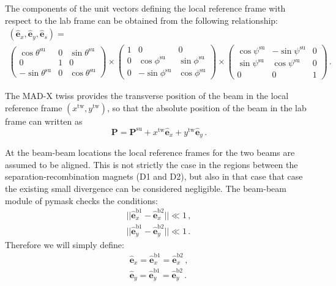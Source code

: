 The components of the unit vectors defining the local reference frame with respect to the lab frame can be obtained from the following relationship:
\begin{multline}
\left(\hat{\textbf{e}}_x, \hat{\textbf{e}}_y, \hat{\textbf{e}}_s\right)=\\
\left(\begin{array}{ccc}
\cos \theta^\text{su} & 0 & \sin \theta^\text{su} \\
0 & 1 & 0 \\
-\sin \theta^\text{su} & 0 & \cos \theta^\text{su}
\end{array}\right)
\times
\left(\begin{array}{ccc}
1 & 0 & 0 \\
0 & \cos \phi^\text{su} & \sin \phi^\text{su} \\
0 & -\sin \phi^\text{su} & \cos \phi^\text{su}
\end{array}\right)
\times
\left(\begin{array}{ccc}
\cos \psi^\text{su} & -\sin \psi^\text{su} & 0 \\
\sin \psi^\text{su} & \cos \psi^\text{su} & 0 \\
0 & 0 & 1
\end{array}\right)   \, .
\end{multline}

The MAD-X twiss provides the transverse position of the beam in the local reference frame $(x^\text{tw}, y^\text{tw})$, so that the absolute position of the beam in the lab frame can written as
\begin{equation}
    \textbf{P} = \textbf{P}^\text{su} 
    + x^\text{tw} \hat{\textbf{e}}_x
    + y^\text{tw} \hat{\textbf{e}}_y
    \, .
\end{equation}

At the beam-beam locations the local reference frames for the two beams are assumed to be aligned. This is not strictly the case in the regions between the separation-recombination magnets (D1 and D2), but also in that case that case the existing small divergence can be considered negligible.
The beam-beam module of pymask checks the conditions:
\begin{align}
    ||\hat{\textbf{e}}_x^\text{b1} -  \hat{\textbf{e}}_x^\text{b2}|| \ll 1 \, ,\\
    ||\hat{\textbf{e}}_y^\text{b1} -  \hat{\textbf{e}}_y^\text{b2}|| \ll 1 \, .
\end{align}
Therefore we will simply define:
\begin{align}
    \hat{\textbf{e}}_x = \hat{\textbf{e}}_x^\text{b1} = \hat{\textbf{e}}_x^\text{b2} \, ,\\
    \hat{\textbf{e}}_y = \hat{\textbf{e}}_y^\text{b1} = \hat{\textbf{e}}_y^\text{b2} \, .
\end{align}

